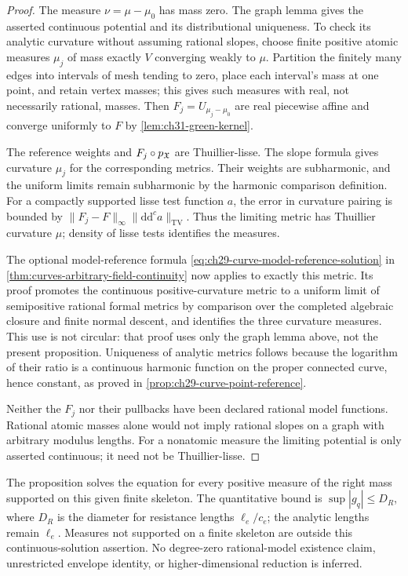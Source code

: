 \begin{proof}
The measure \(\nu=\mu-\mu_0\) has mass zero.  The graph lemma gives
the asserted continuous potential and its distributional uniqueness.
To check its analytic curvature without assuming rational slopes,
choose finite positive atomic measures \(\mu_j\) of mass exactly
\(V\) converging weakly to \(\mu\).  Partition the finitely many
edges into intervals of mesh tending to zero, place each interval's
mass at one point, and retain vertex masses; this gives such measures
with real, not necessarily rational, masses.
Then \(F_j=U_{\mu_j-\mu_0}\) are real piecewise affine and converge
uniformly to \(F\) by \cref{lem:ch31-green-kernel}.

The reference weights and \(F_j\circ p_{\mathfrak X}\) are Thuillier-lisse.
The slope formula gives curvature \(\mu_j\) for the corresponding
metrics.  Their weights are subharmonic, and the uniform limits
remain subharmonic by the harmonic comparison definition.
For a compactly supported lisse test function \(a\), the error in
curvature pairing is bounded by
\(\lVert F_j-F\rVert_\infty
  \lVert\mathrm d\mathrm d^ca\rVert_{\mathrm{TV}}\).
Thus the limiting metric has Thuillier curvature \(\mu\);
density of lisse tests \cite[Proposition~3.2.7]{Thu05} identifies
the measures.

The optional model-reference formula
\eqref{eq:ch29-curve-model-reference-solution} in
\cref{thm:curves-arbitrary-field-continuity} now applies to exactly
this metric.  Its proof promotes the continuous positive-curvature
metric to a uniform limit of semipositive rational formal metrics
by comparison over the completed algebraic closure and finite
normal descent, and identifies the three curvature measures.
This use is not circular: that proof uses only the graph lemma above,
not the present proposition.
Uniqueness of analytic metrics follows because the logarithm of
their ratio is a continuous harmonic function on the proper connected
curve, hence constant, as proved in
\cref{prop:ch29-curve-point-reference}.

Neither the \(F_j\) nor their pullbacks have been declared rational
model functions.  Rational atomic masses alone would not imply
rational slopes on a graph with arbitrary modulus lengths.
For a nonatomic measure the limiting potential is only asserted
continuous; it need not be Thuillier-lisse.
\end{proof}

\begin{remark}
\label{rem:ch31-curve-solution-scope}
The proposition solves the equation for every positive measure of
the right mass supported on this given finite skeleton.
The quantitative bound is
\(\sup|g_q|\leq D_R\), where \(D_R\) is the diameter for resistance
lengths \(\ell_e/c_e\); the analytic lengths remain \(\ell_e\).
Measures not supported on a finite skeleton are outside this
continuous-solution assertion.
No degree-zero rational-model existence claim, unrestricted envelope
identity, or higher-dimensional reduction is inferred.
\end{remark}
